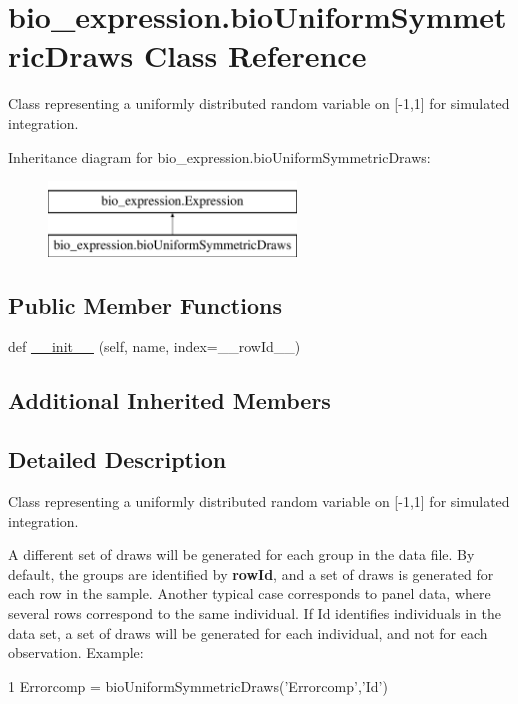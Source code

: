 \hypertarget{classbio__expression_1_1bio_uniform_symmetric_draws}{}\section{bio\+\_\+expression.\+bio\+Uniform\+Symmetric\+Draws Class Reference}
\label{classbio__expression_1_1bio_uniform_symmetric_draws}


Class representing a uniformly distributed random variable on \mbox{[}-\/1,1\mbox{]} for simulated integration.  


Inheritance diagram for bio\+\_\+expression.\+bio\+Uniform\+Symmetric\+Draws\+:\begin{figure}[H]
\begin{center}
\leavevmode
\includegraphics[height=2.000000cm]{classbio__expression_1_1bio_uniform_symmetric_draws}
\end{center}
\end{figure}
\subsection*{Public Member Functions}
\begin{DoxyCompactItemize}
\item 
def \hyperlink{classbio__expression_1_1bio_uniform_symmetric_draws_af310c2bc491a7d84b66cbe21231c9707}{\+\_\+\+\_\+init\+\_\+\+\_\+} (self, name, index=\textquotesingle{}\+\_\+\+\_\+row\+Id\+\_\+\+\_\+\textquotesingle{})
\end{DoxyCompactItemize}
\subsection*{Additional Inherited Members}


\subsection{Detailed Description}
Class representing a uniformly distributed random variable on \mbox{[}-\/1,1\mbox{]} for simulated integration. 

A different set of draws will be generated for each group in the data file. By default, the groups are identified by {\bfseries row\+Id}, and a set of draws is generated for each row in the sample. Another typical case corresponds to panel data, where several rows correspond to the same individual. If Id identifies individuals in the data set, a set of draws will be generated for each individual, and not for each observation. Example\+: 
\begin{DoxyCode}
1 Errorcomp = bioUniformSymmetricDraws(\textcolor{stringliteral}{'Errorcomp'},\textcolor{stringliteral}{'Id'})
\end{DoxyCode}
 

